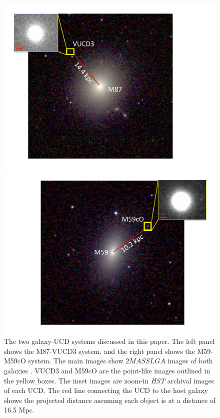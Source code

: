 \documentclass{aastex}
\begin{document}
\begin{figure}[ht!]
  \centering
  \begin{minipage}{0.48\textwidth}
    \includegraphics[trim={0 0 0 0cm},clip,scale=0.37]{vucd3_im.pdf}%
  \end{minipage}
  \begin{minipage}{0.48\textwidth}
    \includegraphics[trim={0 0 0 0cm},clip,scale=0.37]{m59co_im.pdf}%
  \end{minipage}
  \caption{The two galaxy-UCD systems discussed in this paper. The left panel shows the M87-VUCD3 system, and the right panel shows the M59-M59cO system. The main images show $2MASS LGA$ images of both galaxies \citep{jarrett03}.   VUCD3 and M59cO are the point-like images outlined in the yellow boxes. The inset images are zoom-in \textit{HST} archival images of each UCD. The red line connecting the UCD to the host galaxy shows the projected distance assuming each object is at a distance of 16.5 Mpc. }
  
  \label{fig:image}
\end{figure}
\end{document}
